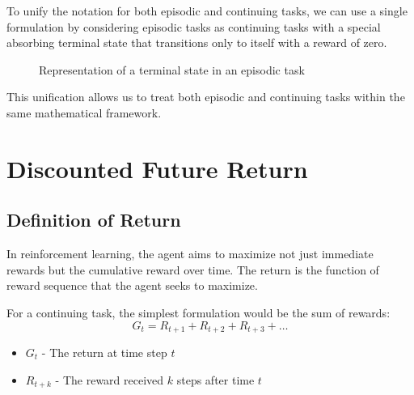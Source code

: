 \documentclass[12pt,a4paper]{article}
\begin{document}
To unify the notation for both episodic and continuing tasks, we can use a single formulation by considering episodic tasks as continuing tasks with a special absorbing terminal state that transitions only to itself with a reward of zero.

\begin{figure}[H]
\centering
{}
\caption{Representation of a terminal state in an episodic task}
\end{figure}

This unification allows us to treat both episodic and continuing tasks within the same mathematical framework.

\section{Discounted Future Return}

\subsection{Definition of Return}

In reinforcement learning, the agent aims to maximize not just immediate rewards but the cumulative reward over time. The return is the function of reward sequence that the agent seeks to maximize.

For a continuing task, the simplest formulation would be the sum of rewards:
\begin{equation}
G_t = R_{t+1} + R_{t+2} + R_{t+3} + \ldots
\end{equation}

\begin{tcolorbox}[title=Notation Overview]
\begin{itemize}
    \item $G_t$ - The return at time step $t$
    \item $R_{t+k}$ - The reward received $k$ steps after time $t$
\end{itemize}
\end{tcolorbox}
\end{document}
